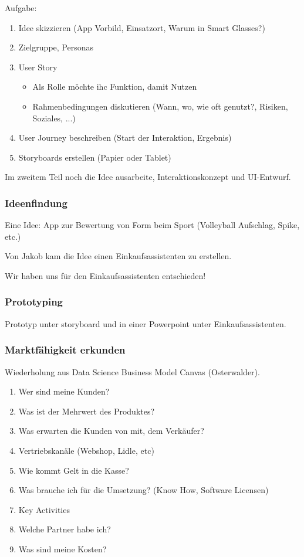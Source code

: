 \documentclass[a4paper]{article}
\begin{document}
Aufgabe:

\begin{enumerate}
    \item Idee skizzieren (App Vorbild, Einsatzort, Warum in Smart Glasses?)
    \item Zielgruppe, Personas
    \item User Story 
    \begin{itemize}
        \item Als Rolle möchte ihc Funktion, damit Nutzen
        \item Rahmenbedingungen diskutieren (Wann, wo, wie oft genutzt?, Risiken, Soziales, ...)
    \end{itemize}
    \item User Journey beschreiben (Start der Interaktion, Ergebnis)
    \item Storyboards erstellen (Papier oder Tablet)
\end{enumerate}

Im zweitem Teil noch die Idee ausarbeite, Interaktionskonzept und UI-Entwurf.

\subsubsection{Ideenfindung}

Eine Idee: App zur Bewertung von Form beim Sport (Volleyball Aufschlag, Spike, etc.)

Von Jakob kam die Idee einen Einkaufsassistenten zu erstellen.

Wir haben uns für den Einkaufsassistenten entschieden!

\subsubsection{Prototyping}

Prototyp unter storyboard und in einer Powerpoint unter Einkaufsassistenten.

\subsubsection{Marktfähigkeit erkunden}

Wiederholung aus Data Science Business Model Canvas (Osterwalder).

\begin{enumerate}
    \item Wer sind meine Kunden?
    \item Was ist der Mehrwert des Produktes?
    \item Was erwarten die Kunden von mit, dem Verkäufer?
    \item Vertriebskanäle (Webshop, Lidle, etc)
    \item Wie kommt Gelt in die Kasse?
    \item Was brauche ich für die Umsetzung? (Know How, Software Licensen)
    \item Key Activities
    \item Welche Partner habe ich?
    \item Was sind meine Kosten?
\end{enumerate}
\end{document}
